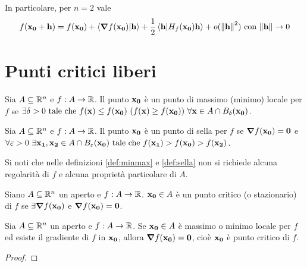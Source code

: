 \begin{remark}
    In particolare, per $n=2$ vale
    $$
        f(\vb{x_0} + \vb{h}) = f(\vb{x_0})+\ip{\grad f(\vb{x_0})}{\vb{h}} + \frac{1}{2}\ip{\vb{h}}{H_f(\vb{x_0})\vb{h}}+o(\norm{\vb{h}}^2) \with \norm{\vb{h}} \to 0
    $$
\end{remark}

\section{Punti critici liberi}

\begin{definition}
    \label{def:minmax}
    Sia $A \subseteq \mathbb{R}^n$ e $f: A \to \mathbb{R}$. Il punto $\vb{x_0}$ è un punto di massimo (minimo) locale per $f$ se $\exists \delta > 0 \text{ tale che } f(\vb{x}) \leq f(\vb{x_0})\ (f(\vb{x})\geq f(\vb{x_0})) \ \forall \vb{x} \in A \cap B_\delta (\vb{x_0})$.
\end{definition}

\begin{definition}
    \label{def:sella}
    Sia $A \subseteq \mathbb{R}^n$ e $f: A \to \mathbb{R}$. Il punto $\vb{x_0}$ è un punto di sella per $f$ se $\grad f(\vb{x_0})=\vb{0}$ e $\forall \varepsilon > 0 \ \exists \vb{x_1}, \vb{x_2} \in A \cap B_\varepsilon(\vb{x_0}) \text{ tale che } f(\vb{x_1}) > f(\vb{x_0}) > f(\vb{x_2})$.
\end{definition}

\begin{remark}
    Si noti che nelle definizioni \ref{def:minmax} e \ref{def:sella} non si richiede alcuna regolarità di $f$ e alcuna proprietà particolare di $A$.
\end{remark}

\begin{definition}
    Siano $A \subseteq \mathbb{R}^n$ un aperto e $f: A\to \mathbb{R}$. $\vb{x_0} \in A$ è un punto critico (o stazionario) di $f$ se $\exists \grad f(\vb{x_0})$ e $\grad f(\vb{x_0})=\vb{0}$.
\end{definition}

\begin{theorem}
    [di Fermat]
    Sia $A \subseteq \mathbb{R}^n$ un aperto e $f: A \to \mathbb{R}$. Se $\vb{x_0} \in A$ è massimo o minimo locale per $f$ ed esiste il gradiente di $f$ in $\vb{x_0}$, allora $\grad f(\vb{x_0})=\vb{0}$, cioè $\vb{x_0}$ è punto critico di $f$.
\end{theorem}

\begin{proof}
\end{proof}

